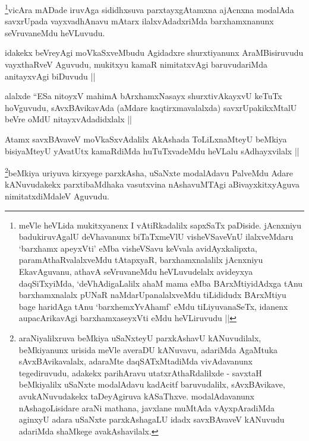 \begin{artha}
\footnote{meVle heVLida mukitxyanenx I vAtiRkadalilx sapxSaTx
  paDiside. jAcnxniyu badukiruvAgalU deVhavanunx biTaTxmeVlU
  visheVSaveVnU ilalxveMdaru `barxhamx apeyxVti' eMba visheVSavu
  keVvala avidAyxkalipxta, paramAthaRvalalxveMdu tAtapxyaR,
  barxhamxnalalilx jAcnxniyu EkavAguvanu, athavA seVruvaneMdu
  heVLuvudelalx avideyxya daqSiTxyiMda, `deVhAdigaLalilx ahaM mama
  eMba BArxMtiyidAdxga tAnu barxhamxnalalx pUNaR naMdarUpanalalxveMdu
  tiLididudx BArxMtiyu bage haridAga tAnu `barxhemxYvAhamf' eMdu
  tiLiyuvanaSeTx, idanenx aupacArikavAgi barxhamxaseyxVti eMdu
  heVLiruvudu ||}vicAra mADade iruvAga sididhxsuva parxtayxgAtamxna ajAcnxna
modalAda savxrUpada vayxvadhAnavu mAtarx ilalxvAdadxriMda
barxhamxnanunx seVruvaneMdu heVLuvudu.
\end{artha}


\begin{artha}
idakekx beVreyAgi moVkaSxveMbudu Agidadxre shurxtiyanunx
AraMBisiruvudu vayxthaRveV Aguvudu, mukitxyu kamaR nimitatxvAgi
baruvudariMda anitayxvAgi biDuvudu ||
\end{artha}

\begin{artha}
alalxde ``ESa nitoyxV mahimA bArxhamxNasayx shurxtivAkayxvU keTuTx
hoVguvudu, sAvxBAvikavAda (aMdare kaqtirxmavalalxda) savxrUpakikxMtalU
beVre oMdU nitayxvAdadidxlalx || 
\end{artha}


\begin{artha}
Atamx savxBAvaveV moVkaSxvAdalilx AkAshada ToLiLxnaMteyU beMkiya
bisiyaMteyU yAvatUtx kamaRdiMda huTuTxvadeMdu heVLalu sAdhayxvilalx ||
\end{artha}


\begin{artha}
\footnote{araNiyalilxruva beMkiya uSaNxteyU parxkAshavU kANuvudilalx,
  beMkiyanunx urisida meVle averaDU kANuvavu, adariMda AgaMtuka
  sAvxBAvikavalalx, adaraMte daqSATxMtadiMda vivAdavanunx
  tegediruvudu, adakekx parihAravu utatxrAthaRdalilxde - savxtaH
  beMkiyalilx uSaNxte modalAdavu kadAcitf baruvudalilx, sAvxBAvikave,
  avukANuvudakekx taDeyAgiruva kASaThxve. modalAdavanunx
  nAshagoLisidare araNi mathana, javxlane muMtAda vAyxpAradiMda
  aginxyU adara uSaNxte parxkAshagaLU idadx savxBAvaveV kANuvudu
  adariMda  shaMkege avakAshavilalx.}beMkiya uriyuva kirxyege parxkAsha, uSaNxte modalAdavu PalveMdu Adare
kANuvudakekx parxtibaMdhaka vasutxvina nAshavuMTAgi aBivayxkitxyAguva
nimitatxdiMdaleV Aguvudu.
\end{artha}

